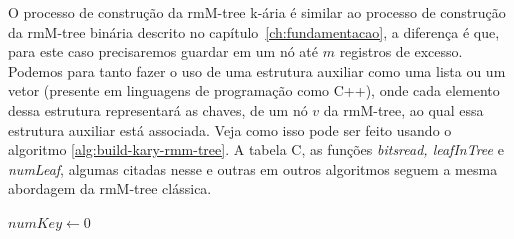 O processo de construção da rmM-tree k-ária é similar ao processo de construção da rmM-tree binária descrito no capítulo~\ref*{ch:fundamentacao},
 a diferença é que, para este caso precisaremos guardar em um nó até $m$ registros de excesso. Podemos para tanto fazer o uso de uma estrutura auxiliar como
 uma lista ou um vetor (presente em linguagens de programação como C++), onde cada elemento dessa estrutura representará as chaves, de um nó $v$ da rmM-tree, ao qual essa estrutura auxiliar está
 associada.
 Veja como isso pode ser feito usando o algoritmo \ref{alg:build-kary-rmm-tree}. A tabela C, as funções \textit{bitsread, leafInTree} e 
 \textit{numLeaf}, algumas citadas nesse e outras em outros algoritmos seguem a mesma abordagem da rmM-tree clássica. 
\begin{algorithm}[h!]

    $numKey \leftarrow 0$\\
\end{algorithm}
